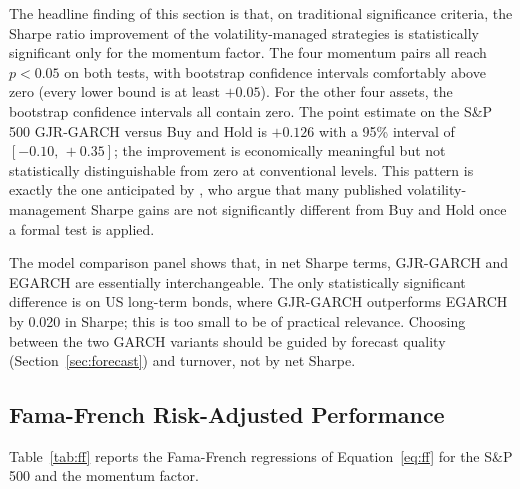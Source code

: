 \documentclass[12pt, a4paper]{article}
\begin{document}
The headline finding of this section is that, on traditional significance criteria, the
Sharpe ratio improvement of the volatility-managed strategies is statistically
significant only for the momentum factor. The four momentum pairs all reach
$p < 0.05$ on both tests, with bootstrap confidence intervals comfortably above zero
(every lower bound is at least $+0.05$). For the other four assets, the bootstrap
confidence intervals all contain zero. The point estimate on the S\&P 500 GJR-GARCH
versus Buy and Hold is $+0.126$ with a 95\% interval of $[-0.10,\,+0.35]$; the
improvement is economically meaningful but not statistically distinguishable from zero at
conventional levels. This pattern is exactly the one anticipated by \citet{Liu2019}, who
argue that many published volatility-management Sharpe gains are not significantly
different from Buy and Hold once a formal test is applied.

The model comparison panel shows that, in net Sharpe terms, GJR-GARCH and EGARCH are
essentially interchangeable. The only statistically significant difference is on US
long-term bonds, where GJR-GARCH outperforms EGARCH by 0.020 in Sharpe; this is too small
to be of practical relevance. Choosing between the two GARCH variants should be guided by
forecast quality (Section~\ref{sec:forecast}) and turnover, not by net Sharpe.

\subsection{Fama-French Risk-Adjusted Performance}
\label{sec:perf_ff}

Table~\ref{tab:ff} reports the Fama-French regressions of Equation~\eqref{eq:ff} for the
S\&P 500 and the momentum factor.
\end{document}
